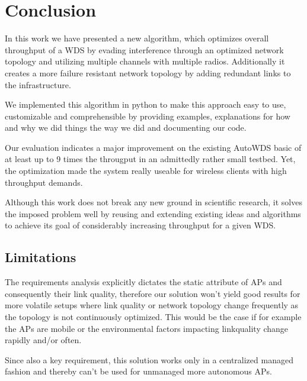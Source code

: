 \chapter{Conclusion}
  In this work we have presented a new algorithm, which optimizes overall throughput of a \ac{WDS} by evading interference through an optimized network topology 
  and utilizing multiple channels with multiple radios. Additionally it creates a more failure resistant network topology by adding redundant links to the infrastructure.
  
  We implemented this algorithm in python to make this approach easy to use, customizable and comprehensible by providing examples, 
  explanations for how and why we did things the way we did and documenting our code.
  
  Our evaluation indicates a major improvement on the existing AutoWDS basic of at least up to 9 times the througput in an admittedly rather small testbed.
  Yet, the optimization made the system really useable for wireless clients with high throughput demands.
  
  Although this work does not break any new ground in scientific research, it solves the imposed problem well by reusing and extending existing ideas and algorithms to
  achieve its goal of considerably increasing throughput for a given \ac{WDS}.
  
  \section{Limitations}
    The requirements analysis explicitly dictates the static attribute of APs and consequently their link quality, therefore our solution won't yield good 
    results for more volatile setups where link quality or network topology change frequently as the topology is not continuously optimized. 
    This would be the case if for example the APs are mobile or the environmental factors impacting linkquality change rapidly and/or often.
    
    Since also a key requirement, this solution works only in a centralized managed fashion and thereby can't be used for unmanaged more autonomous APs.
    
